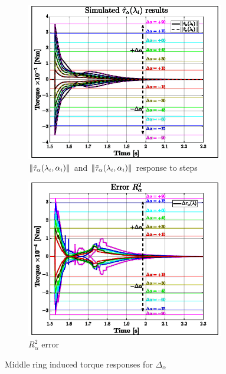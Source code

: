 \begin{figure}[htbp]
\vspace{-8pt}
\centering
\begin{subfigure}{0.49\textwidth}
\centering
\includegraphics[width=0.95\textwidth]{graphs/tau-alpha-hat}
\caption{$\left\lVert\hat{\tau}_\alpha(\lambda_i,\alpha_i)\right\rVert$ and $\left\lVert\tilde{\tau}_\alpha(\lambda_i,\alpha_i)\right\rVert$ response to steps}
\label{fig:tau-alpha-hat}
\end{subfigure}
\begin{subfigure}{0.49\textwidth}
\centering
\includegraphics[width=0.95\textwidth]{graphs/tau-alpha-hat-r}
\caption{$R^2_\alpha$ error}
\label{fig:tau-alpha-hat-r}
\end{subfigure}
\vspace{-4pt}
\caption{Middle ring induced torque responses for $\Delta_\alpha$}
\label{fig:tau-alpha-sim}
\vspace{-16pt}
\end{figure}

